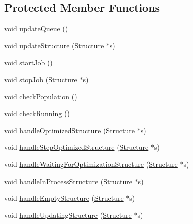 \subsection*{Protected Member Functions}
\begin{DoxyCompactItemize}
\item 
void \hyperlink{classGlobalSearch_1_1QueueManager_a6fba282892d588e57520718d2f42401a}{update\-Queue} ()
\item 
void \hyperlink{classGlobalSearch_1_1QueueManager_a47014fddb8cfd2547899ca272dfb8b0a}{update\-Structure} (\hyperlink{classGlobalSearch_1_1Structure}{Structure} $\ast$s)
\item 
void \hyperlink{classGlobalSearch_1_1QueueManager_a643db68e2525754c897359dfff4dad66}{start\-Job} ()
\item 
void \hyperlink{classGlobalSearch_1_1QueueManager_ab4e0fef123622188942b2a4fe676dbd7}{stop\-Job} (\hyperlink{classGlobalSearch_1_1Structure}{Structure} $\ast$s)
\item 
void \hyperlink{classGlobalSearch_1_1QueueManager_a3c3de93fbb6a3f33d14ce74c541ba690}{check\-Population} ()
\item 
void \hyperlink{classGlobalSearch_1_1QueueManager_a2a85ad6729d9e0eb13782699b6cd5ccd}{check\-Running} ()
\item 
void \hyperlink{classGlobalSearch_1_1QueueManager_aabd2eebaed91b006309adff376cfc22a}{handle\-Optimized\-Structure} (\hyperlink{classGlobalSearch_1_1Structure}{Structure} $\ast$s)
\item 
void \hyperlink{classGlobalSearch_1_1QueueManager_ab9feeb85163af25cd067a5279cccff44}{handle\-Step\-Optimized\-Structure} (\hyperlink{classGlobalSearch_1_1Structure}{Structure} $\ast$s)
\item 
void \hyperlink{classGlobalSearch_1_1QueueManager_a6333f3ba572efd281e6dfd489c01ef8d}{handle\-Waiting\-For\-Optimization\-Structure} (\hyperlink{classGlobalSearch_1_1Structure}{Structure} $\ast$s)
\item 
void \hyperlink{classGlobalSearch_1_1QueueManager_a14667778b10fd542941121f75c01e522}{handle\-In\-Process\-Structure} (\hyperlink{classGlobalSearch_1_1Structure}{Structure} $\ast$s)
\item 
void \hyperlink{classGlobalSearch_1_1QueueManager_afe51c49057d5d0b8fa5ac1272e31fe9f}{handle\-Empty\-Structure} (\hyperlink{classGlobalSearch_1_1Structure}{Structure} $\ast$s)
\item 
void \hyperlink{classGlobalSearch_1_1QueueManager_a82b9d1f1df369bf14c1de84e0b4b5d70}{handle\-Updating\-Structure} (\hyperlink{classGlobalSearch_1_1Structure}{Structure} $\ast$s)

\end{DoxyCompactItemize}
